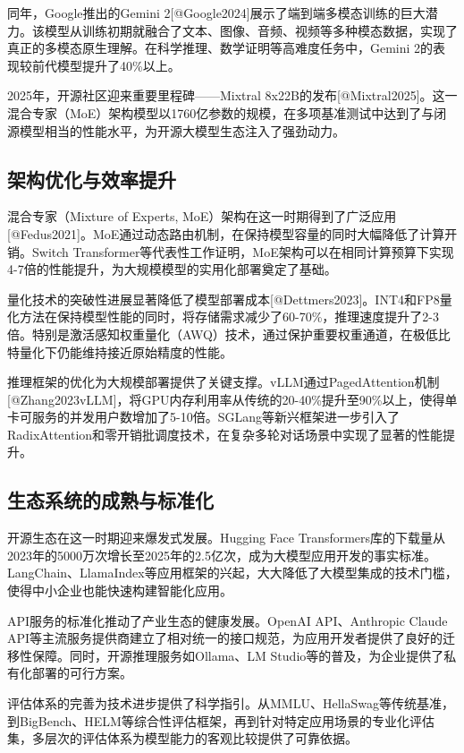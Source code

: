 \documentclass{article}
\begin{document}
同年，Google推出的Gemini 2[@Google2024]展示了端到端多模态训练的巨大潜力。该模型从训练初期就融合了文本、图像、音频、视频等多种模态数据，实现了真正的多模态原生理解。在科学推理、数学证明等高难度任务中，Gemini 2的表现较前代模型提升了40\%以上。

2025年，开源社区迎来重要里程碑——Mixtral 8x22B的发布[@Mixtral2025]。这一混合专家（MoE）架构模型以1760亿参数的规模，在多项基准测试中达到了与闭源模型相当的性能水平，为开源大模型生态注入了强劲动力。

\subsection{架构优化与效率提升}
混合专家（Mixture of Experts, MoE）架构在这一时期得到了广泛应用[@Fedus2021]。MoE通过动态路由机制，在保持模型容量的同时大幅降低了计算开销。Switch Transformer等代表性工作证明，MoE架构可以在相同计算预算下实现4-7倍的性能提升，为大规模模型的实用化部署奠定了基础。

量化技术的突破性进展显著降低了模型部署成本[@Dettmers2023]。INT4和FP8量化方法在保持模型性能的同时，将存储需求减少了60-70\%，推理速度提升了2-3倍。特别是激活感知权重量化（AWQ）技术，通过保护重要权重通道，在极低比特量化下仍能维持接近原始精度的性能。

推理框架的优化为大规模部署提供了关键支撑。vLLM通过PagedAttention机制[@Zhang2023vLLM]，将GPU内存利用率从传统的20-40\%提升至90\%以上，使得单卡可服务的并发用户数增加了5-10倍。SGLang等新兴框架进一步引入了RadixAttention和零开销批调度技术，在复杂多轮对话场景中实现了显著的性能提升。

\subsection{生态系统的成熟与标准化}
开源生态在这一时期迎来爆发式发展。Hugging Face Transformers库的下载量从2023年的5000万次增长至2025年的2.5亿次，成为大模型应用开发的事实标准。LangChain、LlamaIndex等应用框架的兴起，大大降低了大模型集成的技术门槛，使得中小企业也能快速构建智能化应用。

API服务的标准化推动了产业生态的健康发展。OpenAI API、Anthropic Claude API等主流服务提供商建立了相对统一的接口规范，为应用开发者提供了良好的迁移性保障。同时，开源推理服务如Ollama、LM Studio等的普及，为企业提供了私有化部署的可行方案。

评估体系的完善为技术进步提供了科学指引。从MMLU、HellaSwag等传统基准，到BigBench、HELM等综合性评估框架，再到针对特定应用场景的专业化评估集，多层次的评估体系为模型能力的客观比较提供了可靠依据。
\end{document}
